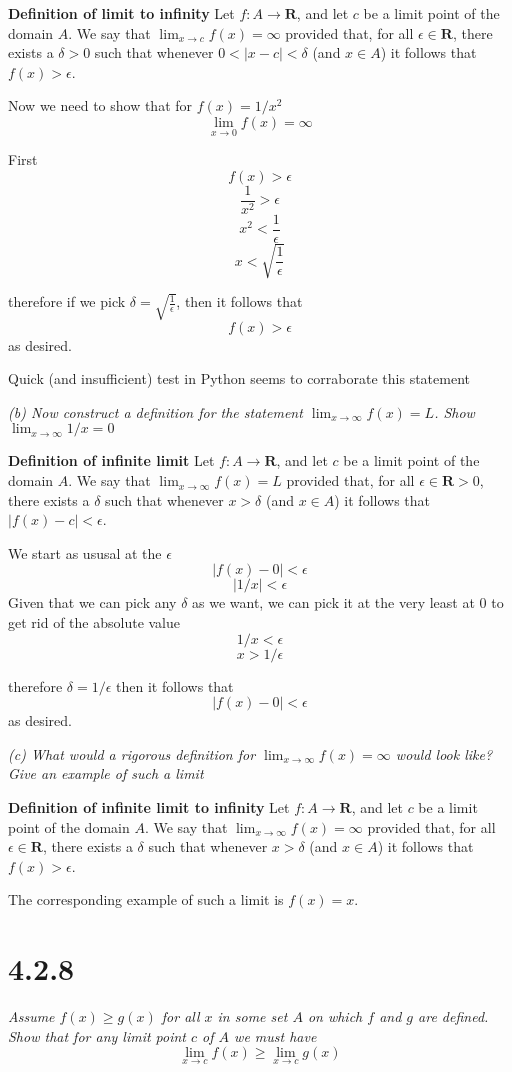 \documentclass[11pt,oneside,titlepage]{article}
\begin{document}
\textbf{Definition of limit to infinity}
Let $f : A \to \textbf{R}$, and let $c$ be a limit point of the domain $A$. We say that
$\lim_{x\to c} f(x) = \infty$ provided that, for all $\epsilon \in \textbf{R}$, there exists
a $\delta > 0$ such that whenever $0 < |x - c| < \delta$ (and $x \in A$) it follows
that $f(x) > \epsilon$.

Now we need to show that for  $f(x) = 1/x^2$
$$\lim_{x \to 0}f(x) = \infty$$

First
$$ f(x) > \epsilon$$
$$ \frac{1}{x^2} > \epsilon$$
$$ x^2 < \frac{1}{\epsilon}$$
$$ x < \sqrt{\frac{1}{\epsilon}}$$

therefore if we pick $\delta = \sqrt{\frac{1}{\epsilon}}$, then it follows that
$$ f(x) > \epsilon$$
as desired.

Quick (and insufficient) test in Python seems to corraborate  this statement

\textit{(b) Now construct a definition for the statement $\lim_{x \to \infty} f(x) = L$. Show
$\lim_{x \to \infty} 1/x = 0$}

\textbf{Definition of infinite limit}
Let $f : A \to \textbf{R}$, and let $c$ be a limit point of the domain $A$. We say that
$\lim_{x \to \infty} f(x) = L$ provided that, for all $\epsilon \in \textbf{R} > 0$, there exists
a $\delta$ such that whenever $x > \delta$ (and $x \in A$) it follows
that $|f(x) - c | < \epsilon$.

We start as ususal at the $\epsilon$
$$|f(x) - 0| < \epsilon$$
$$|1/x| < \epsilon$$
Given that we can pick any $\delta$ as we want, we can pick it at the very least at $0$ to get rid
of the absolute value
$$1/x < \epsilon$$
$$x > 1/\epsilon$$

therefore $\delta = 1/\epsilon$ then it follows that $$|f(x) - 0| < \epsilon$$ as desired.

\textit{(c) What would a rigorous definition for $\lim_{x \to \infty} f(x) = \infty$ would look like? Give an example of such a limit}

\textbf{Definition of infinite limit to infinity}
Let $f : A \to \textbf{R}$, and let $c$ be a limit point of the domain $A$. We say that
$\lim_{x \to \infty} f(x) = \infty$ provided that, for all $\epsilon \in \textbf{R}$, there exists
a $\delta$ such that whenever $x > \delta$ (and $x \in A$) it follows
that $f(x) > \epsilon$.

The corresponding example of such a limit  is $f(x) = x$.

\section*{4.2.8}
\textit{Assume $f(x) \geq g(x)$ for all $x$ in some set $A$ on which $f$ and $g$ are defined. Show that for any limit point $c$ of $A$ we must have }
$$\lim_{x \to c} f(x) \geq \lim_{x \to c} g(x) $$
\end{document}
